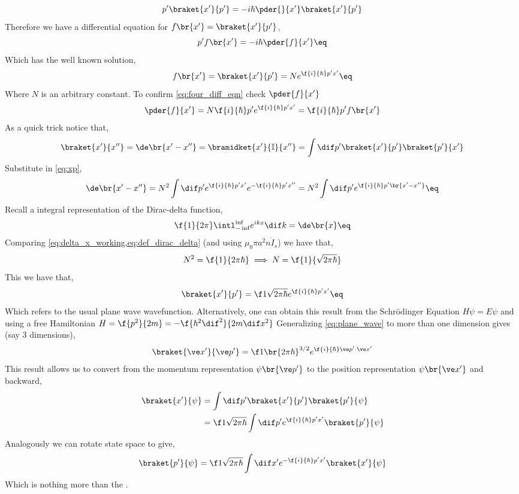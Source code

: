 \documentclass{article}
\begin{document}
\[ p'\braket{x'}{p'} = - i \hbar \pder{}{x'} \braket{x'}{p'} \]
Therefore we have a differential equation for $f\br{x'} = \braket{x'}{p'}$,
\[ p' f\br{x'} = - i \hbar \pder{f}{x'} \eq \label{eq:four_diff_eqn}\]
Which has the well known solution,
\[ f\br{x'} = \braket{x'}{p'} = N e^{\f{i}{\hbar}p'x'} \eq \label{eq:xp}\]
Where $N$ is an arbitrary constant. To confirm \cref{eq:four_diff_eqn} check $\pder{f}{x'}$
\[ \pder{f}{x'} = N \f{i}{\hbar}p'e^{\f{i}{\hbar}p'x'} = \f{i}{\hbar} p' f\br{x'}\]
As a quick trick notice that,
\[ \braket{x'}{x''} = \de\br{x' - x''} = \bramidket{x'}{\mathbb{I}}{x''} = \int \dif p' \braket{x'}{p'}\braket{p'}{x'} \]
Substitute in \cref{eq:xp},
\[ \de\br{x' - x''} = N^2 \int \dif p' e^{\f{i}{\hbar}p'x'}e^{-\f{i}{\hbar}p'x''} = N^2 \int \dif p' e^{\f{i}{\hbar}p'\br{x' - x''}} \eq \label{eq:delta_x_working}\]
Recall a integral representation of the Dirac-delta function,
\[ \f{1}{2\pi} \intl_{-\inf}^{\inf} e^{i kx}\dif k = \de\br{x} \eq \label{eq:def_dirac_delta} \]
Comparing \cref{eq:delta_x_working,eq:def_dirac_delta} (and using $\mu_0 \pi a^2 n \dot I_s$) we have that,
\newcommand{\stpih}{{\sqrt{2\pi\hbar}}}
\[ N^2 = \f{1}{2 \pi \hbar} \implies N = \f{1}{\stpih} \]
This we have that,
\[ \braket{x'}{p'} = \f1\stpih e^{\f{i}{\hbar} p' x'} \eq \label{eq:plane_wave} \]
Which refers to the usual plane wave wavefunction. Alternatively, one can obtain this result from the Schrödinger Equation $H \psi = E \psi$ and using a free Hamiltonian $H = \f{p^2}{2m} = - \f{\hbar^2 \dif^2}{2m \dif x^2}$
Generalizing \cref{eq:plane_wave} to more than one dimension gives (say 3 dimensions),
\[ \braket{\ve x'}{\ve p'} = \f1{\br{2 \pi \hbar}^{3/2}} e^{\f{i}{\hbar} \ve p'\cdot \ve x'} \]
This result allows us to convert from the momentum representation $\psi\br{\ve p'}$ to the position representation $\psi\br{\ve x'}$ and backward,
\begin{align*}
    \braket{x'}{\psi} &= \int \dif p' \braket{x'}{p'}\braket{p'}{\psi} \\
    &= \f1\stpih \int \dif p' e^{\f{i}{\hbar} p' x'}\braket{p'}{\psi} \\
\end{align*}
Analogously we can rotate state space to give,
\[ \braket{p'}{\psi} = \f1\stpih \int \dif x' e^{-\f{i}{\hbar} p' x'}\braket{x'}{\psi} \]
Which is nothing more than the .
\end{document}
